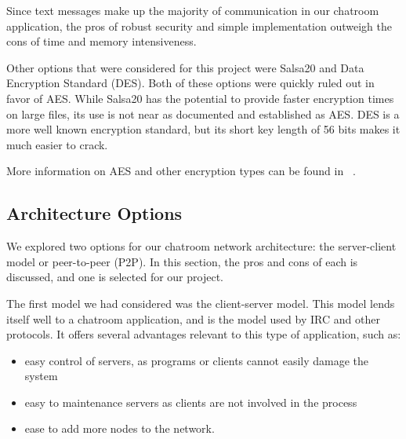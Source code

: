\documentclass{article}
\begin{document}
Since text messages make up the majority of communication in our chatroom application, the pros of robust security and simple implementation outweigh the cons of time and memory intensiveness. 

Other options that were considered for this project were Salsa20 and Data Encryption Standard (DES)\cite{DES_info}. Both of these options were quickly ruled out in favor of AES. While Salsa20 has the potential to provide faster encryption times on large files, its use is not near as documented and established as AES. DES is a more well known encryption standard, but its short key length of 56 bits makes it much easier to crack. 

More information on AES and other encryption types can be found in ~\cite{encryption}.

\subsection{Architecture Options}

We explored two options for our chatroom network architecture: the server-client model or peer-to-peer (P2P). In this section, the pros and cons of each is discussed, and one is selected for our project. 


The first model we had considered was the client-server model. This model lends itself well to a chatroom application, and is the model used by IRC \cite{IRCmemo} and other protocols. It offers several advantages relevant to this type of application, such as:

\begin{itemize}
  \item easy control of servers, as programs or clients cannot easily damage the system
  \item easy to maintenance servers as clients are not involved in the process
  \item ease to add more nodes to the network.
\end{itemize}
\end{document}
